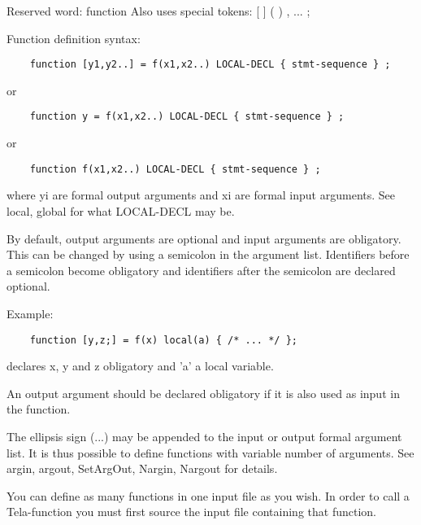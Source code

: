 \documentclass[a4paper]{article}
\begin{document}
Reserved word: function
Also uses special tokens: {[} ] ( ) , ... ;

Function definition syntax:

\begin{tscreen}
\begin{verbatim}
    function [y1,y2..] = f(x1,x2..) LOCAL-DECL { stmt-sequence } ;
\end{verbatim}
\end{tscreen}

or
\begin{tscreen}
\begin{verbatim}
    function y = f(x1,x2..) LOCAL-DECL { stmt-sequence } ;
\end{verbatim}
\end{tscreen}

or
\begin{tscreen}
\begin{verbatim}
    function f(x1,x2..) LOCAL-DECL { stmt-sequence } ;
\end{verbatim}
\end{tscreen}

where yi are formal output arguments and xi are formal input arguments.
See local, global for what LOCAL-DECL may be.

By default, output arguments are optional and input arguments are
obligatory. This can be changed by using a semicolon in the argument list.
Identifiers before a semicolon become obligatory and identifiers after
the semicolon are declared optional.

Example:
\begin{tscreen}
\begin{verbatim}
    function [y,z;] = f(x) local(a) { /* ... */ };
\end{verbatim}
\end{tscreen}

declares x, y and z obligatory and 'a' a local variable.

An output argument should be declared obligatory if it is also used
as input in the function.

The ellipsis sign (...) may be appended to the input or output formal
argument list. It is thus possible to define functions with variable
number of arguments. See argin, argout, SetArgOut, Nargin, Nargout
for details.

You can define as many functions in one input file as you wish.
In order to call a Tela-function you must first source the input file
containing that function.
\end{document}
